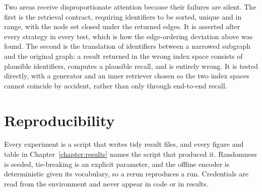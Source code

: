 Two areas receive disproportionate attention because their failures are silent.
The first is the retrieval contract, requiring identifiers to be sorted, unique
and in range, with the node set closed under the returned edges. It is asserted
after every strategy in
every test, which is how the edge-ordering deviation above was found. The second
is the translation of identifiers between a narrowed subgraph and the original
graph: a result returned in the wrong index space consists of plausible
identifiers, computes a plausible recall, and is entirely wrong. It is tested
directly, with a generator and an inner retriever chosen so the two index spaces
cannot coincide by accident, rather than only through end-to-end recall.

\section{Reproducibility} \label{sec:implementation-reproducibility}

Every experiment is a script that writes tidy result files, and every figure and
table in Chapter~\ref{chapter:results} names the script that produced it.
Randomness is seeded, tie-breaking is an explicit parameter, and the offline
encoder is deterministic given its vocabulary, so a rerun reproduces a run.
Credentials are read from the environment and never appear in code or in results.
